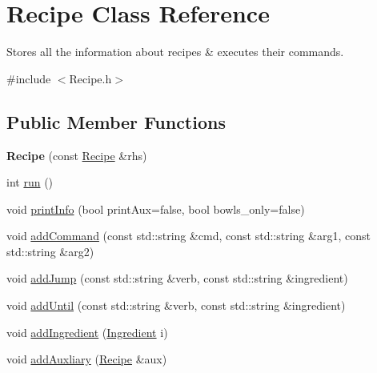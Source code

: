 \hypertarget{classRecipe}{\section{Recipe Class Reference}
\label{classRecipe}
}


Stores all the information about recipes \& executes their commands.  




{\ttfamily \#include $<$Recipe.\-h$>$}

\subsection*{Public Member Functions}
\begin{DoxyCompactItemize}
\item 
\hypertarget{classRecipe_aab4e4187d162a84a189622dbfd60fc3a}{{\bfseries Recipe} (const \hyperlink{classRecipe}{Recipe} \&rhs)}\label{classRecipe_aab4e4187d162a84a189622dbfd60fc3a}

\item 
int \hyperlink{classRecipe_a2cec7c48e273bbedca60469f2a33bc0b}{run} ()
\item 
void \hyperlink{classRecipe_aa9a086810c68a0f459f3eded4fec249d}{print\-Info} (bool print\-Aux=false, bool bowls\-\_\-only=false)
\item 
void \hyperlink{classRecipe_ac201541a889d806bf9b2fb5dc43efb4b}{add\-Command} (const std\-::string \&cmd, const std\-::string \&arg1, const std\-::string \&arg2)
\item 
void \hyperlink{classRecipe_a480f62255eb7a7b804cb738549d62430}{add\-Jump} (const std\-::string \&verb, const std\-::string \&ingredient)
\item 
void \hyperlink{classRecipe_ad389932900137e7cdf7e93509ef6818b}{add\-Until} (const std\-::string \&verb, const std\-::string \&ingredient)
\item 
void \hyperlink{classRecipe_a85c5fcfd5fbe1d1956e85ee1656af3a7}{add\-Ingredient} (\hyperlink{classIngredient}{Ingredient} i)
\item 
void \hyperlink{classRecipe_aa8238253913982ef70b6ea4bad997fed}{add\-Auxliary} (\hyperlink{classRecipe}{Recipe} \&aux)
\end{DoxyCompactItemize}

